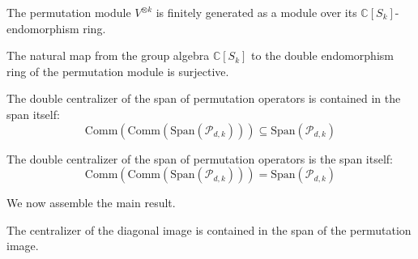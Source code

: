 \begin{lemma}\label{lem:permModule_finite_over_endRing}
  \leanok
  The permutation module $V^{\otimes k}$ is finitely generated as a module over its $\mathbb{C}[S_k]$-endomorphism ring.
\end{lemma}

\begin{theorem}\label{thm:permModule_toModuleEnd_surjective}
  \leanok
  The natural map from the group algebra $\mathbb{C}[S_k]$ to the double endomorphism ring of the permutation module is surjective.
\end{theorem}

\begin{theorem}\label{thm:double_centralizer_permImage'}
  \leanok
  The double centralizer of the span of permutation operators is contained in the span itself:
  \begin{equation}
    \text{Comm}(\text{Comm}(\text{Span}(\mathcal{P}_{d,k}))) \subseteq \text{Span}(\mathcal{P}_{d,k})
  \end{equation}
\end{theorem}

\begin{theorem}\label{thm:double_centralizer_permImage}
  \leanok
  The double centralizer of the span of permutation operators is the span itself:
  \begin{equation}
    \text{Comm}(\text{Comm}(\text{Span}(\mathcal{P}_{d,k}))) = \text{Span}(\mathcal{P}_{d,k})
  \end{equation}
\end{theorem}

We now assemble the main result.

\begin{theorem}\label{thm:centralizer_diagImage_le_span_permImage_small}
  \leanok
  The centralizer of the diagonal image is contained in the span of the permutation image.
\end{theorem}

